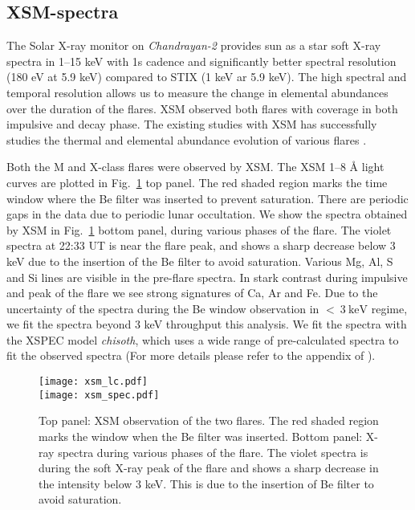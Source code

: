 \subsection{XSM-spectra}\label{sec:xsm}

The Solar X-ray monitor on {\it Chandrayan-2}\citep[{\it Chandrayan-2}/XSM,][]{xsm} provides sun as a star soft X-ray spectra in 1{--}15 keV with 1s cadence and significantly better spectral resolution (180 eV at 5.9 keV) compared to STIX (1 keV ar 5.9 keV). The high spectral and temporal resolution allows us to measure the change in elemental abundances over the duration of the flares. XSM observed both flares with coverage in both impulsive and decay phase. The existing studies with XSM has successfully studies the thermal and elemental abundance evolution of various flares \citep{mondal21,kkepa23,nama23}.

Both the M and X-class flares were observed by XSM. The XSM 1{--}8 {\AA} light curves are plotted in Fig.~\ref{fig:xsm-obs} top panel. The red shaded region marks the time window where the Be filter was inserted to prevent saturation. There are periodic gaps in the data due to periodic lunar occultation. We show the spectra obtained by XSM in Fig.~\ref{fig:xsm-obs} bottom panel, during various phases of the flare. The violet spectra at 22:33 UT is near the flare peak, and shows a sharp decrease below 3 keV due to the insertion of the Be filter to avoid saturation. Various Mg, Al, S and Si lines are visible in the pre-flare spectra. In stark contrast during impulsive and peak of the flare we see strong signatures of Ca, Ar and Fe. Due to the uncertainty of the spectra during the Be window observation in $<~3~\mathrm{keV}$ regime, we fit the spectra beyond 3 keV throughput this analysis. We fit the spectra with the XSPEC model {\it chisoth}, which uses a wide range of pre-calculated spectra to fit the observed spectra (For more details please refer to the appendix of \cite{mondal21}).

\begin{figure}[ht!]
\centering
    \texttt{[image: xsm\_lc.pdf]} \\
    \texttt{[image: xsm\_spec.pdf]}
    \caption[XSM observation of the February 22nd, 2024 flare.]{Top panel: XSM observation of the two flares. The red shaded region marks the window when the Be filter was inserted. Bottom panel: X-ray spectra during various phases of the flare. The violet spectra is during the soft X-ray peak of the flare and shows a sharp decrease in the intensity below 3 keV. This is due to the insertion of Be filter to avoid saturation.}
    \label{fig:xsm-obs}
\end{figure}

